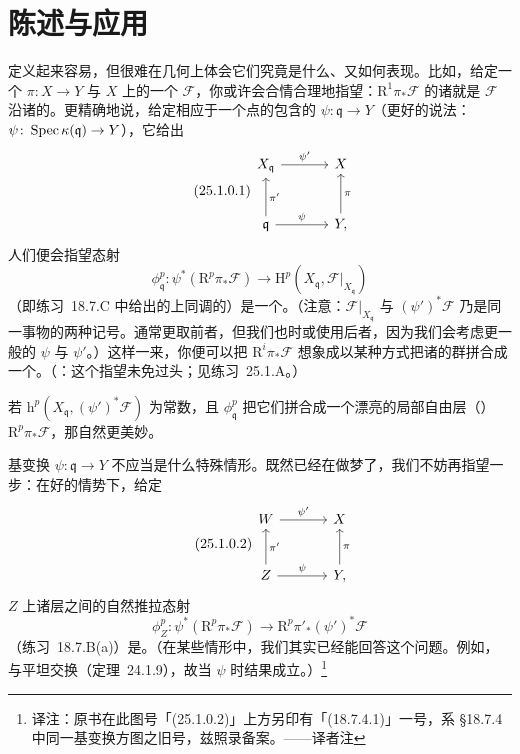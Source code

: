 
\section{陈述与应用}

\trHigherPushforward{}定义起来容易，但很难在几何上体会它们究竟是什么、又如何表现。比如，给定一个\trMorphism{} $\pi\colon X\to Y$ 与 $X$ 上的一个\trQCSheaf{} $\mathscr{F}$，你或许会合情合理地指望：$\mathrm{R}^1\pi_*\mathscr{F}$ 的诸\trFiber{}就是 $\mathscr{F}$ 沿诸\trFiber{}的\trCohomology。更精确地说，给定相应于一个点的包含的 $\psi\colon\mathfrak{q}\to Y$（更好的说法：$\psi\colon\operatorname{Spec}\kappa(\mathfrak{q})\to Y$），它给出\trCartesianDiagram
\begin{equation*}\tag{25.1.0.1}\label{eq:cartesian-point-square}
\begin{tikzcd}[row sep=2.6em, column sep=3.4em]
X_{\mathfrak{q}} \ar[r, "\psi'"] & X \\
\mathfrak{q} \ar[r, "\psi"] \ar[u, "\pi'"'] & Y, \ar[u, "\pi"']
\end{tikzcd}
\end{equation*}
人们便会指望态射
\[
\boxed{\phi^p_{\mathfrak{q}}\colon\psi^*(\mathrm{R}^p\pi_*\mathscr{F})\longrightarrow\mathrm{H}^p(X_{\mathfrak{q}},\mathscr{F}|_{X_{\mathfrak{q}}})}
\]
（即\mbox{练习~18.7.C} 中给出的上同调的\trPushPullMap）是一个\trIsomorphism。（注意：$\mathscr{F}|_{X_{\mathfrak{q}}}$ 与 $(\psi')^*\mathscr{F}$ 乃是同一事物的两种记号。通常更取前者，但我们也时或使用后者，因为我们会考虑更一般的 $\psi$ 与 $\psi'$。）这样一来，你便可以把 $\mathrm{R}^i\pi_*\mathscr{F}$ 想象成以某种方式把诸\trFiber{}的\trCohomology{}群拼合成一个\trCoherentSheaf。（\trhWarning{}：这个指望未免过头；见\mbox{练习~25.1.A}。）

若 $\mathrm{h}^p(X_{\mathfrak{q}},(\psi')^*\mathscr{F})$ 为常数，且 $\phi^p_{\mathfrak{q}}$ 把它们拼合成一个漂亮的局部自由层（\trVectorBundle）$\mathrm{R}^p\pi_*\mathscr{F}$，那自然更美妙。

基变换 $\psi\colon\mathfrak{q}\to Y$ 不应当是什么特殊情形。既然已经在做梦了，我们不妨再指望一步：在好的情势下，给定\trCartesianDiagram
\begin{equation*}\tag{25.1.0.2}\label{eq:cartesian-square-general}
\begin{tikzcd}[row sep=2.6em, column sep=3.4em]
W \ar[r, "\psi'"] & X \\
Z \ar[r, "\psi"] \ar[u, "\pi'"'] & Y, \ar[u, "\pi"']
\end{tikzcd}
\end{equation*}
$Z$ 上诸层之间的自然推拉态射
\begin{equation*}\tag{25.1.0.3}\label{eq:natural-pushpull-morphism}
\boxed{\phi^p_Z\colon\psi^*(\mathrm{R}^p\pi_*\mathscr{F})\longrightarrow\mathrm{R}^p\pi'_*(\psi')^*\mathscr{F}}
\end{equation*}
（\mbox{练习~18.7.B}(a)）是\trIsomorphism。（在某些情形中，我们其实已经能回答这个问题。例如，\trCohomology{}与平坦\trBaseChange{}交换（\mbox{定理~24.1.9}），故当 $\psi$ \trFlat{}时结果成立。）\footnote{译注：原书在此图号「(25.1.0.2)」上方另印有「(18.7.4.1)」一号，系 \S18.7.4 中同一基变换方图之旧号，兹照录备案。——译者注}

